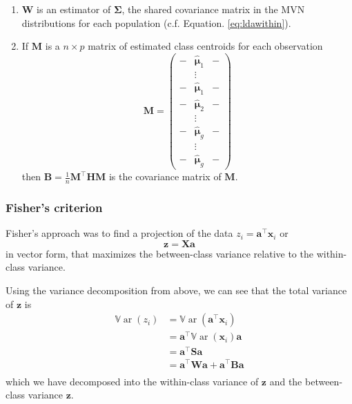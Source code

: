 \documentclass[
]{book}
\theoremstyle{definition}
\theoremstyle{definition}
\theoremstyle{definition}
\theoremstyle{definition}
\theoremstyle{remark}
\begin{document}
\begin{enumerate}
\def\labelenumi{\arabic{enumi}.}
\item
  \(\mathbf W\) is an estimator of \(\boldsymbol{\Sigma}\), the shared covariance matrix in the MVN distributions for each population (c.f. Equation.
  \eqref{eq:ldawithin}).
\item
  If \(\mathbf M\) is a \(n \times p\) matrix of estimated class centroids for each observation
  \[\mathbf M= \begin{pmatrix} -& \hat{{\boldsymbol{\mu}}}_1 &-\\
  &\vdots &\\
  -& \hat{{\boldsymbol{\mu}}}_1 &-\\
  -& \hat{{\boldsymbol{\mu}}}_2 &-\\
  &\vdots&\\
  -& \hat{{\boldsymbol{\mu}}}_g &-\\
  &\vdots &\\
  -& \hat{{\boldsymbol{\mu}}}_g &-\end{pmatrix}\]
  then \(\mathbf B=\frac{1}{n}\mathbf M^\top\mathbf H\mathbf M\) is the covariance matrix of \(\mathbf M\).
\end{enumerate}

\hypertarget{fishers-criterion}{%
\subsubsection*{Fisher's criterion}\label{fishers-criterion}}

Fisher's approach was to find a projection of the data \(z_i = \mathbf a^\top \mathbf x_i\) or
\[\mathbf z= \mathbf X\mathbf a\]
in vector form,
that maximizes the between-class variance relative to the within-class variance.

Using the variance decomposition from above, we can see that the total variance of \(\mathbf z\) is
\begin{align*}
{\mathbb{V}\operatorname{ar}}(z_i)&= {\mathbb{V}\operatorname{ar}}(\mathbf a^\top \mathbf x_i)\\
&=\mathbf a^\top {\mathbb{V}\operatorname{ar}}(\mathbf x_i) \mathbf a\\
&=\mathbf a^\top \mathbf S\mathbf a\\
&= \mathbf a^\top\mathbf W\mathbf a+ \mathbf a^\top\mathbf B\mathbf a\\
\end{align*}
which we have decomposed into the within-class variance of \(\mathbf z\) and the between-class variance \(\mathbf z\).
\end{document}

